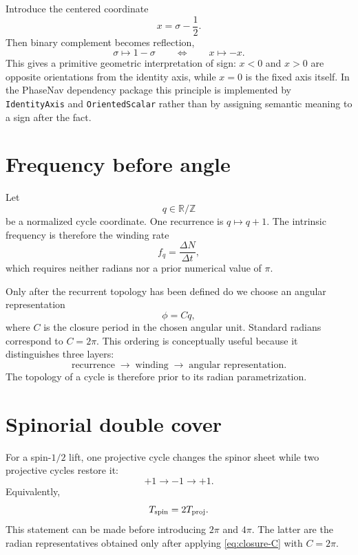 Introduce the centered coordinate
\begin{equation}
x=\sigma-\frac12.
\label{eq:centered-sigma}
\end{equation}
Then binary complement becomes reflection,
\begin{equation}
\sigma\mapsto1-\sigma
\qquad\Longleftrightarrow\qquad
x\mapsto-x.
\label{eq:sigma-reflection}
\end{equation}
This gives a primitive geometric interpretation of sign: $x<0$ and $x>0$ are opposite orientations from the identity axis, while $x=0$ is the fixed axis itself.  In the PhaseNav dependency package this principle is implemented by \texttt{IdentityAxis} and \texttt{OrientedScalar} rather than by assigning semantic meaning to a sign after the fact.

\section{Frequency before angle}
Let
\begin{equation}
q\in\mathbb R/\mathbb Z
\label{eq:q-cycle}
\end{equation}
be a normalized cycle coordinate.  One recurrence is $q\mapsto q+1$.  The intrinsic frequency is therefore the winding rate
\begin{equation}
f_q=\frac{\Delta N}{\Delta t},
\label{eq:winding-frequency}
\end{equation}
which requires neither radians nor a prior numerical value of $\pi$.

Only after the recurrent topology has been defined do we choose an angular representation
\begin{equation}
\phi=Cq,
\label{eq:closure-C}
\end{equation}
where $C$ is the closure period in the chosen angular unit.  Standard radians correspond to $C=2\pi$.  This ordering is conceptually useful because it distinguishes three layers:
\begin{equation}
\boxed{
\text{recurrence}\;\longrightarrow\;\text{winding}\;\longrightarrow\;\text{angular representation}
}.
\end{equation}
The topology of a cycle is therefore prior to its radian parametrization.

\section{Spinorial double cover}
For a spin-$1/2$ lift, one projective cycle changes the spinor sheet while two projective cycles restore it:
\begin{equation}
+1\longrightarrow-1\longrightarrow+1.
\label{eq:spinor-sheet-cycle}
\end{equation}
Equivalently,
\begin{equation}
T_{\rm spin}=2T_{\rm proj}.
\label{eq:double-period}
\end{equation}
This statement can be made before introducing $2\pi$ and $4\pi$.  The latter are the radian representatives obtained only after applying \eqref{eq:closure-C} with $C=2\pi$.

